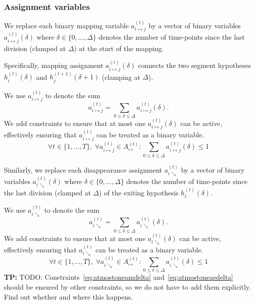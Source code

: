 \documentclass[a4paper]{article}
\newcommand{\TP}[1]{{\color{Red}\sc \textbf{TP:} #1}{}}
\newcommand{\set}[1]{\ensuremath{\{#1\}}}
\newcommand{\vhtid}[3][t]{\ensuremath{h^{(#1)}_{#2}\left({#3}\right)}\xspace}
\newcommand{\vamset}[1]{\ensuremath{A^{(#1)}_{\mapsto}}\xspace}
\newcommand{\Amt}[1][t]{\vamset{#1}}
\newcommand{\vam}[3]{\ensuremath{a^{(#1)}_{#2\mapsto#3}}\xspace}
\newcommand{\vamd}[4]{\ensuremath{a^{(#1)}_{#2\mapsto#3}\left(#4\right)}\xspace}
\newcommand{\vae}[2]{\ensuremath{a^{(#1)}_{#2\searrow}}\xspace}
\newcommand{\vaed}[3]{\ensuremath{a^{(#1)}_{#2\searrow}\left(#3\right)}\xspace}
\begin{document}
\subsubsection{Assignment variables}
%
\newcommand{\vamtij}{\vam{t}{i}{j}}
\newcommand{\vamtijd}[1][\delta]{\vamd{t}{i}{j}{#1}}
We replace each binary mapping variable \vamtij by a vector of binary variables \vamtijd where $\delta\in\set{0,\dots,\Delta}$ denotes the number of time-points since the last division (clamped at $\Delta$) at the start of the mapping.

Specifically, mapping assignment \vamtijd connects the two segment hypotheses \vhtid{i}{\delta} and \vhtid[t+1]{j}{\delta+1} (clamping at $\Delta$).

We use \vamtij to denote the sum
\begin{equation}
	\vamtij = \sum_{0 \leq \delta \leq \Delta} \vamtijd.
\end{equation}
We add constraints to ensure that at most one \vamtijd can be active, effectively ensuring that \vamtij can be treated as a binary variable.
\begin{equation}\label{eq:atmostoneamdelta}
  \forall t \in \set{1, \dots, T},\;
  \forall \vamtij \in \Amt:
		\sum_{0 \leq \delta \leq \Delta} \vamtijd
  	\leq 1
\end{equation}
%

\newcommand{\vaeti}{\vae{t}{i}}
\newcommand{\vaetid}[1][\delta]{\vaed{t}{i}{#1}}
\noindent
Similarly, we replace each disappearance assignment \vaeti by a vector of binary variables \vaetid where $\delta\in\set{0,\dots,\Delta}$ denotes the number of time-points since the last division (clamped at $\Delta$) of the exiting hypothesis \vhtid{i}{\delta}.

We use \vaeti to denote the sum
\begin{equation}
	\vaeti = \sum_{0 \leq \delta \leq \Delta} \vaetid.
\end{equation}
We add constraints to ensure that at most one \vaetid can be active, effectively ensuring that \vaeti can be treated as a binary variable.
\begin{equation}\label{eq:atmostoneaedelta}
  \forall t \in \set{1, \dots, T},\;
  \forall \vaeti \in \Amt:
		\sum_{0 \leq \delta \leq \Delta} \vaetid
  	\leq 1
\end{equation}
%
%
\TP{TODO: Constraints~\eqref{eq:atmostoneamdelta} and~\eqref{eq:atmostoneaedelta} should be ensured by other constraints, so we do not have to add them explicitly. Find out whether and where this happens.}
%
%
%
\end{document}

